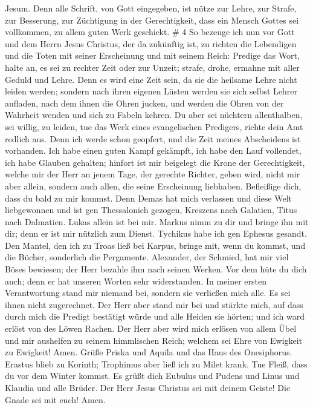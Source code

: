 Jesum.  Denn alle Schrift, von Gott eingegeben, ist nütze
zur Lehre, zur Strafe, zur Besserung, zur Züchtigung in der
Gerechtigkeit,  dass ein Mensch Gottes sei vollkommen, zu
allem guten Werk geschickt. \# 4  So bezeuge ich nun vor
Gott und dem Herrn Jesus Christus, der da zukünftig ist, zu richten die
Lebendigen und die Toten mit seiner Erscheinung und mit seinem Reich:
 Predige das Wort, halte an, es sei zu rechter Zeit oder zur
Unzeit; strafe, drohe, ermahne mit aller Geduld und Lehre. 
Denn es wird eine Zeit sein, da sie die heilsame Lehre nicht leiden
werden; sondern nach ihren eigenen Lüsten werden sie sich selbst Lehrer
aufladen, nach dem ihnen die Ohren jucken,  und werden die
Ohren von der Wahrheit wenden und sich zu Fabeln kehren.  Du
aber sei nüchtern allenthalben, sei willig, zu leiden, tue das Werk
eines evangelischen Predigers, richte dein Amt redlich aus. 
Denn ich werde schon geopfert, und die Zeit meines Abscheidens ist
vorhanden.  Ich habe einen guten Kampf gekämpft, ich habe
den Lauf vollendet, ich habe Glauben gehalten;  hinfort ist
mir beigelegt die Krone der Gerechtigkeit, welche mir der Herr an jenem
Tage, der gerechte Richter, geben wird, nicht mir aber allein, sondern
auch allen, die seine Erscheinung liebhaben.  Befleißige
dich, dass du bald zu mir kommst.  Denn Demas hat mich
verlassen und diese Welt liebgewonnen und ist gen Thessalonich gezogen,
Kreszens nach Galatien, Titus nach Dalmatien.  Lukas allein
ist bei mir. Markus nimm zu dir und bringe ihn mit dir; denn er ist mir
nützlich zum Dienst.  Tychikus habe ich gen Ephesus
gesandt.  Den Mantel, den ich zu Troas ließ bei Karpus,
bringe mit, wenn du kommst, und die Bücher, sonderlich die Pergamente.
 Alexander, der Schmied, hat mir viel Böses bewiesen; der
Herr bezahle ihm nach seinen Werken.  Vor dem hüte du dich
auch; denn er hat unseren Worten sehr widerstanden.  In
meiner ersten Verantwortung stand mir niemand bei, sondern sie verließen
mich alle. Es sei ihnen nicht zugerechnet.  Der Herr aber
stand mir bei und stärkte mich, auf dass durch mich die Predigt
bestätigt würde und alle Heiden sie hörten; und ich ward erlöst von des
Löwen Rachen.  Der Herr aber wird mich erlösen von allem
Übel und mir aushelfen zu seinem himmlischen Reich; welchem sei Ehre von
Ewigkeit zu Ewigkeit! Amen.  Grüße Priska und Aquila und
das Haus des Onesiphorus.  Erastus blieb zu Korinth;
Trophimus aber ließ ich zu Milet krank.  Tue Fleiß, dass du
vor dem Winter kommst. Es grüßt dich Eubulus und Pudens und Linus und
Klaudia und alle Brüder.  Der Herr Jesus Christus sei mit
deinem Geiste! Die Gnade sei mit euch! Amen.
